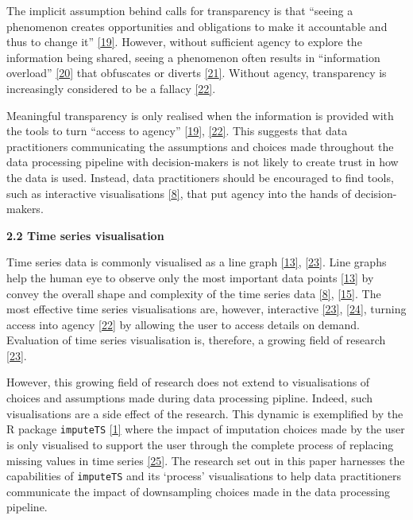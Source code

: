 \documentclass{article}
\begin{document}
The implicit assumption behind calls for transparency is that ``seeing a
phenomenon creates opportunities and obligations to make it accountable
and thus to change it''
\protect\hyperlink{ref-transparency_lack}{{[}19{]}}. However, without
sufficient agency to explore the information being shared, seeing a
phenomenon often results in ``information overload''
\protect\hyperlink{ref-digital_transparency}{{[}20{]}} that obfuscates
or diverts \protect\hyperlink{ref-transparency_obfuscation}{{[}21{]}}.
Without agency, transparency is increasingly considered to be a fallacy
\protect\hyperlink{ref-transparency_fallacy}{{[}22{]}}.

Meaningful transparency is only realised when the information is
provided with the tools to turn ``access to agency''
\protect\hyperlink{ref-transparency_lack}{{[}19{]}},
\protect\hyperlink{ref-transparency_fallacy}{{[}22{]}}. This suggests
that data practitioners communicating the assumptions and choices made
throughout the data processing pipeline with decision-makers is not
likely to create trust in how the data is used. Instead, data
practitioners should be encouraged to find tools, such as interactive
visualisations \protect\hyperlink{ref-datapoint}{{[}8{]}}, that put
agency into the hands of decision-makers.

\textbf{2.2 Time series visualisation}

Time series data is commonly visualised as a line graph
\protect\hyperlink{ref-Sveinn}{{[}13{]}},
\protect\hyperlink{ref-timenotes}{{[}23{]}}. Line graphs help the human
eye to observe only the most important data points
\protect\hyperlink{ref-Sveinn}{{[}13{]}} by convey the overall shape and
complexity of the time series data
\protect\hyperlink{ref-datapoint}{{[}8{]}},
\protect\hyperlink{ref-downsampling}{{[}15{]}}. The most effective time
series visualisations are, however, interactive
\protect\hyperlink{ref-timenotes}{{[}23{]}},
\protect\hyperlink{ref-plotly}{{[}24{]}}, turning access into agency
\protect\hyperlink{ref-transparency_fallacy}{{[}22{]}} by allowing the
user to access details on demand. Evaluation of time series
visualisation is, therefore, a growing field of research
\protect\hyperlink{ref-timenotes}{{[}23{]}}.

However, this growing field of research does not extend to
visualisations of choices and assumptions made during data processing
pipline. Indeed, such visualisations are a side effect of the research.
This dynamic is exemplified by the R package \texttt{imputeTS}
\protect\hyperlink{ref-imputeTS_R}{{[}1{]}} where the impact of
imputation choices made by the user is only visualised to support the
user through the complete process of replacing missing values in time
series \protect\hyperlink{ref-imputeTS}{{[}25{]}}. The research set out
in this paper harnesses the capabilities of \texttt{imputeTS} and its
`process' visualisations to help data practitioners communicate the
impact of downsampling choices made in the data processing pipeline.
\end{document}
